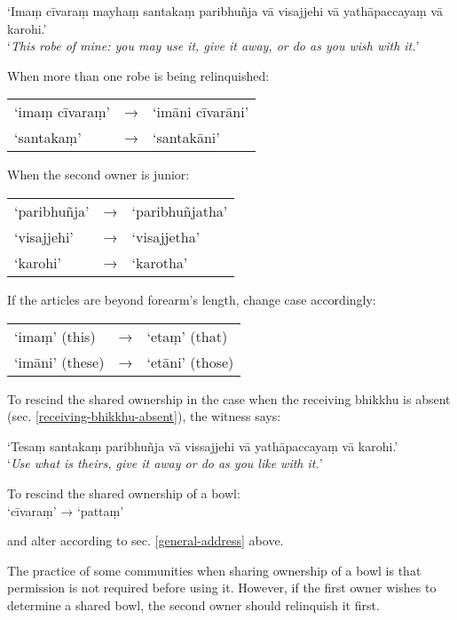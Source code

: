 ‘Imaṃ cīvaraṃ mayhaṃ santakaṃ paribhuñja vā visajjehi vā yathāpaccayaṃ vā karohi.’\\
‘\emph{This robe of mine: you may use it, give it away, or do as you wish with it.}’


When more than one robe is being relinquished:

\begin{tabular}{@{}lll@{}}
‘imaṃ cīvaraṃ’ & → & ‘imāni cīvarāni’\\
‘santakaṃ’ & → & ‘santakāni’\\
\end{tabular}

When the second owner is junior:

\begin{tabular}{@{}lll@{}}
‘paribhuñja’ & → & ‘paribhuñjatha’\\
‘visajjehi’ & → & ‘visajjetha’\\
‘karohi’ & → & ‘karotha’\\
\end{tabular}

If the articles are beyond forearm's length, change case accordingly:

\begin{tabular}{@{}lll@{}}
  ‘imaṃ’ (this) & → & ‘etaṃ’ (that)\\
  ‘imāni’ (these) & → & ‘etāni’ (those)\\
\end{tabular}

To rescind the shared ownership in the case when the receiving bhikkhu is absent
(sec. \ref{receiving-bhikkhu-absent}), the witness says:

‘Tesaṃ santakaṃ paribhuñja vā vissajjehi vā yathāpaccayaṃ vā karohi.’\\
‘\emph{Use what is theirs, give it away or do as you like with it.}’

To rescind the shared ownership of a bowl:\\
‘cīvaraṃ’ → ‘pattaṃ’

and alter according to sec. \ref{general-address} above.

The practice of some communities when sharing ownership of a bowl is that
permission is not required before using it. However, if the first owner wishes
to determine a shared bowl, the second owner should relinquish it first.

